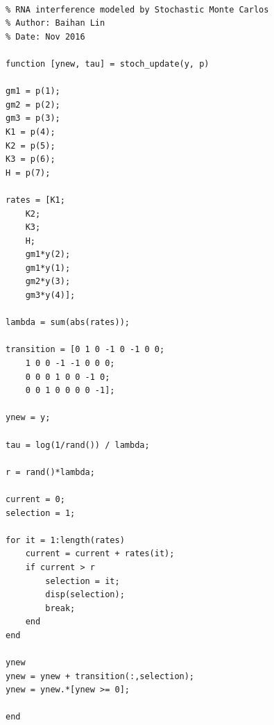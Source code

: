\documentclass[fleqn,10pt]{wlscirep}
\begin{document}
\begin{lstlisting}

% RNA interference modeled by Stochastic Monte Carlos
% Author: Baihan Lin
% Date: Nov 2016

function [ynew, tau] = stoch_update(y, p)

gm1 = p(1);
gm2 = p(2);
gm3 = p(3);
K1 = p(4);
K2 = p(5);
K3 = p(6);
H = p(7);

rates = [K1;
    K2;
    K3;
    H;
    gm1*y(2);
    gm1*y(1);
    gm2*y(3);
    gm3*y(4)];

lambda = sum(abs(rates));

transition = [0 1 0 -1 0 -1 0 0;
    1 0 0 -1 -1 0 0 0;
    0 0 0 1 0 0 -1 0;
    0 0 1 0 0 0 0 -1];

ynew = y;

tau = log(1/rand()) / lambda;

r = rand()*lambda;

current = 0;
selection = 1;

for it = 1:length(rates)
    current = current + rates(it);
    if current > r
        selection = it;
        disp(selection);
        break;
    end
end

ynew
ynew = ynew + transition(:,selection);
ynew = ynew.*[ynew >= 0];

end

\end{lstlisting}
\end{document}
